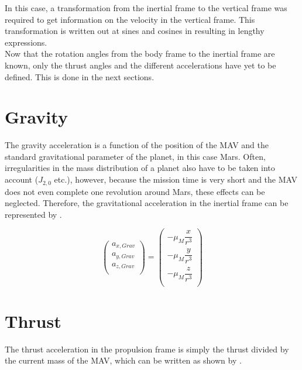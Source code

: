 In this case, a transformation from the inertial frame to the vertical frame was required to get information on the velocity in the vertical frame. This transformation is written out at sines and cosines in  resulting in lengthy expressions. \\

Now that the rotation angles from the body frame to the inertial frame are known, only the thrust angles and the different accelerations have yet to be defined. This is done in the next sections.


\section{Gravity}
\label{sec:gravityModel}
The gravity acceleration is a function of the position of the \ac{MAV} and the standard gravitational parameter of the planet, in this case Mars. Often, irregularities in the mass distribution of a planet also have to be taken into account ($J_{2,0}$ etc.), however, because the mission time is very short and the \ac{MAV} does not even complete one revolution around Mars, these effects can be neglected. Therefore, the gravitational acceleration in the inertial frame can be represented by .

\begin{equation} \label{eq:gravityModel}
\begin{pmatrix}
a_{x,Grav}\\
a_{y,Grav}\\
a_{z,Grav}\\
\end{pmatrix}
=
\begin{pmatrix}
-\mu_{M}\dfrac{x}{r^{3}}\\
-\mu_{M}\dfrac{y}{r^{3}}\\
-\mu_{M}\dfrac{z}{r^{3}}\\
\end{pmatrix}
\end{equation}



\section{Thrust}
\label{sec:thrustModel}
The thrust acceleration in the propulsion frame is simply the thrust divided by the current mass of the \ac{MAV}, which can be written as shown by .

